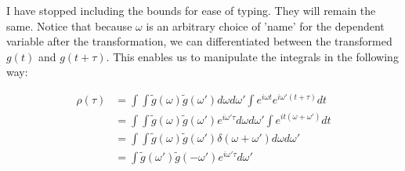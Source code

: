 \documentclass[11pt]{article}
\begin{document}
I have stopped including the bounds for ease of typing. They will remain the same. Notice that because $\omega$ is an arbitrary choice of 'name' for the dependent variable after the transformation, we can differentiated between the transformed $g(t)$ and $g(t+\tau)$. This enables us to manipulate the integrals in the following way: 

\begin{align*}
	\rho(\tau) &= \int \int \widetilde{g}(\omega)\widetilde{g}(\omega') d\omega d\omega' \int e^{i\omega t}e^{i\omega'(t+\tau)} dt \\ 
	&= \int \int \widetilde{g}(\omega)\widetilde{g}(\omega') e^{i \omega' \tau} d\omega d\omega' \int e^{i t (\omega + \omega')} dt \\ 
	&= \int \int \widetilde{g}(\omega)\widetilde{g}(\omega') \delta(\omega+\omega') d\omega d\omega' \\ 
	&= \int \widetilde{g}(\omega') \widetilde{g}(-\omega')e^{i \omega' \tau} d\omega'
\end{align*}
\end{document}
